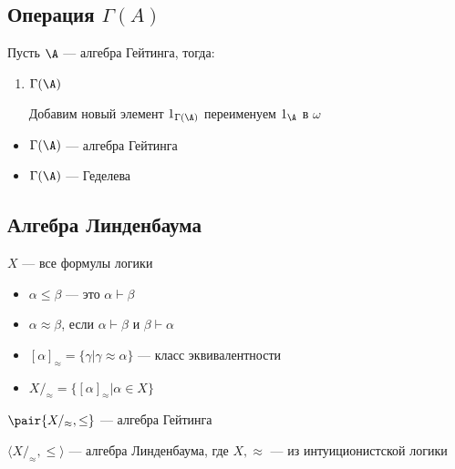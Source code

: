 \documentclass[english]{article}
\begin{document}
\subsection{Операция \(\Gamma(A)\)}
\label{sec:org5eb1202}
\begin{definition}
	Пусть \(\A\) --- алгебра Гейтинга, тогда:
	\begin{enumerate}
		\item \(\Gamma(\A)\) \\
		      \begin{center}
		      \end{center}

		      Добавим новый элемент \(1_{\Gamma(\A)}\) переименуем \(1_\A\) в  \(\omega\)
	\end{enumerate}
	\label{org9782613}
\end{definition}
\begin{theorem}
	\-
	\begin{itemize}
		\item \(\Gamma(\A)\) --- алгебра Гейтинга
		\item \(\Gamma(\A)\) --- Геделева
	\end{itemize}
	\label{org67330ed}
\end{theorem}
\subsection{Алгебра Линденбаума}
\label{sec:org84b5e2c}
\begin{definition}
	\(X\) --- все формулы логики
	\begin{itemize}
		\item \(\alpha \le \beta\) --- это \(\alpha \vdash \beta\)
		\item \(\alpha \approx \beta\), если \(\alpha \vdash \beta\) и \(\beta \vdash \alpha\)
		\item \([\alpha]_\approx = \{\gamma \big| \gamma \approx \alpha\}\) --- класс эквивалентности
		\item \(X/_\approx = \{[\alpha]_\approx \big| \alpha \in X\}\)
	\end{itemize}
	\(\pair{X/_\approx, \le}\) --- алгебра Гейтинга
	\label{org59ff855}
\end{definition}
\begin{property}
	\(\langle X/_\approx, \le \rangle\) --- алгебра Линденбаума, где \(X, \approx\) --- из интуиционистской логики
	\label{orge71db6e}
\end{property}
\end{document}
